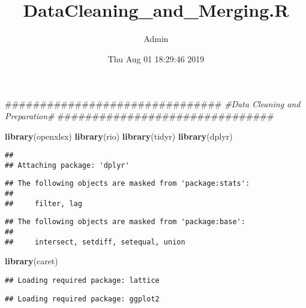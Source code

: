 \documentclass[]{article}
\title{DataCleaning\_and\_Merging.R}
\author{Admin}
\date{Thu Aug 01 18:29:46 2019}
\newenvironment{Shaded}{\begin{snugshade}}{\end{snugshade}}
\newcommand{\KeywordTok}[1]{\textcolor[rgb]{0.13,0.29,0.53}{\textbf{#1}}}
\newcommand{\DataTypeTok}[1]{\textcolor[rgb]{0.13,0.29,0.53}{#1}}
\newcommand{\DecValTok}[1]{\textcolor[rgb]{0.00,0.00,0.81}{#1}}
\newcommand{\StringTok}[1]{\textcolor[rgb]{0.31,0.60,0.02}{#1}}
\newcommand{\CommentTok}[1]{\textcolor[rgb]{0.56,0.35,0.01}{\textit{#1}}}
\newcommand{\OtherTok}[1]{\textcolor[rgb]{0.56,0.35,0.01}{#1}}
\newcommand{\OperatorTok}[1]{\textcolor[rgb]{0.81,0.36,0.00}{\textbf{#1}}}
\newcommand{\NormalTok}[1]{#1}
\begin{document}
\maketitle

\begin{Shaded}
\begin{Highlighting}[]
\NormalTok{###############################}
\CommentTok{#Data Cleaning and Preparation#}
\NormalTok{###############################}

\KeywordTok{library}\NormalTok{(openxlsx)}
\KeywordTok{library}\NormalTok{(rio)}
\KeywordTok{library}\NormalTok{(tidyr)}
\KeywordTok{library}\NormalTok{(dplyr)}
\end{Highlighting}
\end{Shaded}

\begin{verbatim}
## 
## Attaching package: 'dplyr'
\end{verbatim}

\begin{verbatim}
## The following objects are masked from 'package:stats':
## 
##     filter, lag
\end{verbatim}

\begin{verbatim}
## The following objects are masked from 'package:base':
## 
##     intersect, setdiff, setequal, union
\end{verbatim}

\begin{Shaded}
\begin{Highlighting}[]
\KeywordTok{library}\NormalTok{(caret)}
\end{Highlighting}
\end{Shaded}

\begin{verbatim}
## Loading required package: lattice
\end{verbatim}

\begin{verbatim}
## Loading required package: ggplot2
\end{verbatim}

\begin{Shaded}
\end{Shaded}
\end{document}
